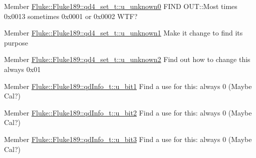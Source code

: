 \begin{DoxyDescription}
\item[Member \hyperlink{structFluke_1_1Fluke189_1_1qd4__set__t_a35c68a594812dba53791a2e32dbfacb6}{Fluke::Fluke189::qd4\_\-set\_\-t::u\_\-unknown0} ]FIND OUT::Most times 0x0013 sometimes 0x0001 or 0x0002 WTF? 
\end{DoxyDescription}

\label{todo__todo000018}
\hypertarget{todo__todo000018}{}
 
\begin{DoxyDescription}
\item[Member \hyperlink{structFluke_1_1Fluke189_1_1qd4__set__t_aa49bec7dfd9d22c392297cdff277afd9}{Fluke::Fluke189::qd4\_\-set\_\-t::u\_\-unknown1} ]Make it change to find its purpose 
\end{DoxyDescription}

\label{todo__todo000019}
\hypertarget{todo__todo000019}{}
 
\begin{DoxyDescription}
\item[Member \hyperlink{structFluke_1_1Fluke189_1_1qd4__set__t_a7ac5798f6713dc4b811b2388d9374c74}{Fluke::Fluke189::qd4\_\-set\_\-t::u\_\-unknown2} ]Find out how to change this always 0x01 
\end{DoxyDescription}

\label{todo__todo000008}
\hypertarget{todo__todo000008}{}
 
\begin{DoxyDescription}
\item[Member \hyperlink{structFluke_1_1Fluke189_1_1qdInfo__t_a49bb210666c03813d3e2dd5e7739c97f}{Fluke::Fluke189::qdInfo\_\-t::u\_\-bit1} ]Find a use for this: always 0 (Maybe Cal?) 
\end{DoxyDescription}

\label{todo__todo000009}
\hypertarget{todo__todo000009}{}
 
\begin{DoxyDescription}
\item[Member \hyperlink{structFluke_1_1Fluke189_1_1qdInfo__t_a3ee66a3c3b07169f2470fc7b8d832601}{Fluke::Fluke189::qdInfo\_\-t::u\_\-bit2} ]Find a use for this: always 0 (Maybe Cal?) 
\end{DoxyDescription}

\label{todo__todo000010}
\hypertarget{todo__todo000010}{}
 
\begin{DoxyDescription}
\item[Member \hyperlink{structFluke_1_1Fluke189_1_1qdInfo__t_a1989b018d05ed21b310846a8cba4099e}{Fluke::Fluke189::qdInfo\_\-t::u\_\-bit3} ]Find a use for this: always 0 (Maybe Cal?) 
\end{DoxyDescription}

